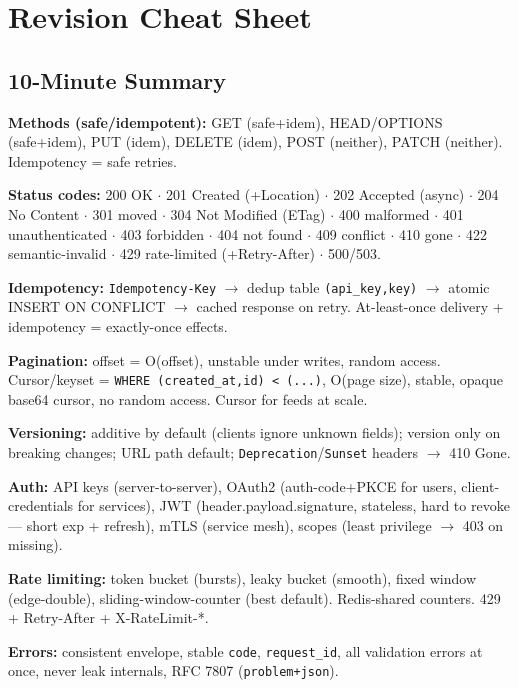 \documentclass[11pt]{article}
\begin{document}
\section{Revision Cheat Sheet}\label{revision-cheat-sheet}

\subsection{10-Minute Summary}\label{10-minute-summary}

\textbf{Methods (safe/idempotent):} GET (safe+idem), HEAD/OPTIONS (safe+idem), PUT (idem), DELETE (idem), POST (neither), PATCH (neither). Idempotency = safe retries.

\textbf{Status codes:} 200 OK \(\cdot\) 201 Created (+Location) \(\cdot\) 202 Accepted (async) \(\cdot\) 204 No Content \(\cdot\) 301 moved \(\cdot\) 304 Not Modified (ETag) \(\cdot\) 400 malformed \(\cdot\) 401 unauthenticated \(\cdot\) 403 forbidden \(\cdot\) 404 not found \(\cdot\) 409 conflict \(\cdot\) 410 gone \(\cdot\) 422 semantic-invalid \(\cdot\) 429 rate-limited (+Retry-After) \(\cdot\) 500/503.

\textbf{Idempotency:} \texttt{Idempotency-Key} \(\rightarrow\) dedup table \texttt{(api\_key,key)} \(\rightarrow\) atomic INSERT ON CONFLICT \(\rightarrow\) cached response on retry. At-least-once delivery + idempotency = exactly-once effects.

\textbf{Pagination:} offset = O(offset), unstable under writes, random access. Cursor/keyset = \texttt{WHERE\ (created\_at,id)\ \textless{}\ (...)}, O(page size), stable, opaque base64 cursor, no random access. Cursor for feeds at scale.

\textbf{Versioning:} additive by default (clients ignore unknown fields); version only on breaking changes; URL path default; \texttt{Deprecation}/\texttt{Sunset} headers \(\rightarrow\) 410 Gone.

\textbf{Auth:} API keys (server-to-server), OAuth2 (auth-code+PKCE for users, client-credentials for services), JWT (header.payload.signature, stateless, hard to revoke --- short exp + refresh), mTLS (service mesh), scopes (least privilege \(\rightarrow\) 403 on missing).

\textbf{Rate limiting:} token bucket (bursts), leaky bucket (smooth), fixed window (edge-double), sliding-window-counter (best default). Redis-shared counters. 429 + Retry-After + X-RateLimit-*.

\textbf{Errors:} consistent envelope, stable \texttt{code}, \texttt{request\_id}, all validation errors at once, never leak internals, RFC 7807 (\texttt{problem+json}).
\end{document}
